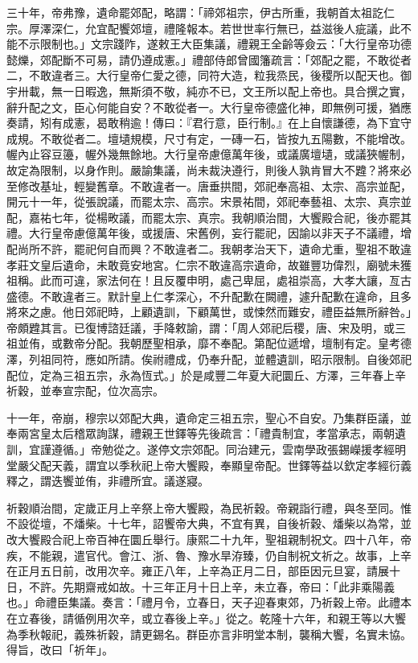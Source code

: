 \begin{pinyinscope}
三十年，帝弗豫，遺命罷郊配，略謂：「禘郊祖宗，伊古所重，我朝首太祖訖仁宗。厚澤深仁，允宜配饗郊壇，禮隆報本。若世世率行無已，益滋後人疵議，此不能不示限制也。」文宗踐阼，遂敕王大臣集議，禮親王全齡等僉云：「大行皇帝功德懿爍，郊配斷不可易，請仍遵成憲。」禮部侍郎曾國籓疏言：「郊配之罷，不敢從者二，不敢違者三。大行皇帝仁愛之德，同符大造，粒我烝民，後稷所以配天也。御宇卅載，無一日暇逸，無斯須不敬，純亦不已，文王所以配上帝也。具合撰之實，辭升配之文，臣心何能自安？不敢從者一。大行皇帝德盛化神，即無例可援，猶應奏請，矧有成憲，曷敢稍逾！傳曰：『君行意，臣行制。』在上自懷謙德，為下宜守成規。不敢從者二。壇壝規模，尺寸有定，一磚一石，皆按九五陽數，不能增改。幄內止容豆籩，幄外幾無餘地。大行皇帝慮億萬年後，或議廣壇壝，或議狹幄制，故定為限制，以身作則。嚴諭集議，尚未裁決遵行，則後人孰肯冒大不韙？將來必至修改基址，輕變舊章。不敢違者一。唐垂拱間，郊祀奉高祖、太宗、高宗並配，開元十一年，從張說議，而罷太宗、高宗。宋景祐間，郊祀奉藝祖、太宗、真宗並配，嘉祐七年，從楊畋議，而罷太宗、真宗。我朝順治間，大饗殿合祀，後亦罷其禮。大行皇帝慮億萬年後，或援唐、宋舊例，妄行罷祀，因諭以非天子不議禮，增配尚所不許，罷祀何自而興？不敢違者二。我朝孝治天下，遺命尤重，聖祖不敢違孝莊文皇后遺命，未敢竟安地宮。仁宗不敢違高宗遺命，故雖豐功偉烈，廟號未獲祖稱。此而可違，家法何在！且反覆申明，處己卑屈，處祖崇高，大孝大讓，亙古盛德。不敢違者三。默計皇上仁孝深心，不升配歉在闕禮，遽升配歉在違命，且多將來之慮。他日郊祀時，上顧遺訓，下顧萬世，或悚然而難安，禮臣益無所辭咎。」帝頗韙其言。已復博諮廷議，手降敕諭，謂：「周人郊祀后稷，唐、宋及明，或三祖並侑，或數帝分配。我朝歷聖相承，靡不奉配。第配位遞增，壇制有定。皇考德澤，列祖同符，應如所請。俟祔禮成，仍奉升配，並體遺訓，昭示限制。自後郊祀配位，定為三祖五宗，永為恆式。」於是咸豐二年夏大祀圜丘、方澤，三年春上辛祈穀，並奉宣宗配，位次高宗。

十一年，帝崩，穆宗以郊配大典，遺命定三祖五宗，聖心不自安。乃集群臣議，並奉兩宮皇太后稽眾詢謀，禮親王世鐸等先後疏言：「禮貴制宜，孝當承志，兩朝遺訓，宜謹遵循。」帝勉從之。遂停文宗郊配。同治建元，雲南學政張錫嶸援孝經明堂嚴父配天義，謂宜以季秋祀上帝大饗殿，奉顯皇帝配。世鐸等益以欽定孝經衍義釋之，謂迭饗並侑，非禮所宜。議遂寢。

祈穀順治間，定歲正月上辛祭上帝大饗殿，為民祈穀。帝親詣行禮，與冬至同。惟不設從壇，不燔柴。十七年，詔饗帝大典，不宜有異，自後祈穀、燔柴以為常，並改大饗殿合祀上帝百神在圜丘舉行。康熙二十九年，聖祖親制祝文。四十八年，帝疾，不能親，遣官代。會江、浙、魯、豫水旱洊臻，仍自制祝文祈之。故事，上辛在正月五日前，改用次辛。雍正八年，上辛為正月二日，部臣因元旦宴，請展十日，不許。先期齋戒如故。十三年正月十日上辛，未立春，帝曰：「此非乘陽義也。」命禮臣集議。奏言：「禮月令，立春日，天子迎春東郊，乃祈穀上帝。此禮本在立春後，請循例用次辛，或立春後上辛。」從之。乾隆十六年，和親王等以大饗為季秋報祀，義殊祈穀，請更錫名。群臣亦言非明堂本制，襲稱大饗，名實未協。得旨，改曰「祈年」。


\end{pinyinscope}
